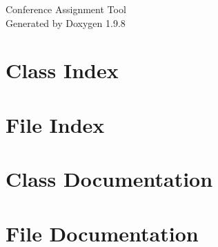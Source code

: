 \documentclass[twoside]{book}
\newcommand{\+}{\discretionary{\mbox{\scriptsize$\hookleftarrow$}}{}{}}
\newcommand{\clearemptydoublepage}{%
    \newpage{\pagestyle{empty}\cleardoublepage}%
  }
\begin{document}
  \raggedbottom
    \hypersetup{pageanchor=false,
                bookmarksnumbered=true,
                pdfencoding=unicode
               }
  \begin{titlepage}
  \vspace*{7cm}
  \begin{center}%
  {\Large Conference Assignment Tool}\\
  \vspace*{1cm}
  {\large Generated by Doxygen 1.9.8}\\
  \end{center}
  \end{titlepage}
  \clearemptydoublepage
  \tableofcontents
  \clearemptydoublepage
  \hypersetup{pageanchor=true}

\chapter{Class Index}

\chapter{File Index}

\chapter{Class Documentation}









\chapter{File Documentation}



























  \backmatter
  \newpage
  \clearemptydoublepage
  \printindex
\end{document}
